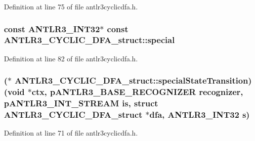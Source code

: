 Definition at line 75 of file antlr3cyclicdfa.\-h.

\hypertarget{struct_a_n_t_l_r3___c_y_c_l_i_c___d_f_a__struct_a48569ed0751db6efb88bb4cc8f9834fe}{
\subsubsection[{special}]{\setlength{\rightskip}{0pt plus 5cm}const {\bf A\-N\-T\-L\-R3\-\_\-\-I\-N\-T32}$\ast$ const A\-N\-T\-L\-R3\-\_\-\-C\-Y\-C\-L\-I\-C\-\_\-\-D\-F\-A\-\_\-struct\-::special}}\label{struct_a_n_t_l_r3___c_y_c_l_i_c___d_f_a__struct_a48569ed0751db6efb88bb4cc8f9834fe}


Definition at line 82 of file antlr3cyclicdfa.\-h.

\hypertarget{struct_a_n_t_l_r3___c_y_c_l_i_c___d_f_a__struct_a97d6b475952a30aab4ce67a33e4b8e5c}{
\subsubsection[{special\-State\-Transition}]{($\ast$ A\-N\-T\-L\-R3\-\_\-\-C\-Y\-C\-L\-I\-C\-\_\-\-D\-F\-A\-\_\-struct\-::special\-State\-Transition)(void $\ast$ctx, {\bf p\-A\-N\-T\-L\-R3\-\_\-\-B\-A\-S\-E\-\_\-\-R\-E\-C\-O\-G\-N\-I\-Z\-E\-R} recognizer, {\bf p\-A\-N\-T\-L\-R3\-\_\-\-I\-N\-T\-\_\-\-S\-T\-R\-E\-A\-M} is, struct {\bf A\-N\-T\-L\-R3\-\_\-\-C\-Y\-C\-L\-I\-C\-\_\-\-D\-F\-A\-\_\-struct} $\ast$dfa, {\bf A\-N\-T\-L\-R3\-\_\-\-I\-N\-T32} {\bf s})}}\label{struct_a_n_t_l_r3___c_y_c_l_i_c___d_f_a__struct_a97d6b475952a30aab4ce67a33e4b8e5c}


Definition at line 71 of file antlr3cyclicdfa.\-h.

